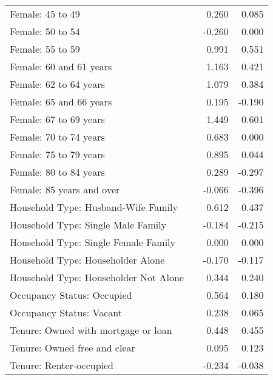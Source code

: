 \begin{center}
\begin{small}
\begin{longtable}{l D{.}{.}{2.3} D{.}{.}{2.3} D{.}{.}{2.3} }
Female: 45 to 49                               &        & 0.260  & 0.085  \\
Female: 50 to 54                               &        & -0.260 & 0.000  \\
Female: 55 to 59                               &        & 0.991  & 0.551  \\
Female: 60 and 61 years                        &        & 1.163  & 0.421  \\
Female: 62 to 64 years                         &        & 1.079  & 0.384  \\
Female: 65 and 66 years                        &        & 0.195  & -0.190 \\
Female: 67 to 69 years                         &        & 1.449  & 0.601  \\
Female: 70 to 74 years                         &        & 0.683  & 0.000  \\
Female: 75 to 79 years                         &        & 0.895  & 0.044  \\
Female: 80 to 84 years                         &        & 0.289  & -0.297 \\
Female: 85 years and over                      &        & -0.066 & -0.396 \\
Household Type: Husband-Wife Family            &        & 0.612  & 0.437  \\
Household Type: Single Male Family             &        & -0.184 & -0.215 \\
Household Type: Single Female Family           &        & 0.000  & 0.000  \\
Household Type: Householder Alone              &        & -0.170 & -0.117 \\
Household Type: Householder Not Alone          &        & 0.344  & 0.240  \\
Occupancy Status: Occupied                     &        & 0.564  & 0.180  \\
Occupancy Status: Vacant                       &        & 0.238  & 0.065  \\
Tenure: Owned with mortgage or loan            &        & 0.448  & 0.455  \\
Tenure: Owned free and clear                   &        & 0.095  & 0.123  \\
Tenure: Renter-occupied                        &        & -0.234 & -0.038 \\
\end{longtable}
\end{small}
\end{center}

